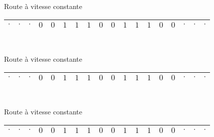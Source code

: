 \documentclass[12pt]{beamer}
\begin{document}
\begin{frame}{Route à vitesse constante}
\begin{center}
    \begin{tabular}{|c|c|c|c|c|c|c|c|c|c|c|c|c|c|c|c|c|c|}\hline
     $\cdot$ & $\cdot$ & $\cdot$ & $0$ & $0$ & $1$ & $1$ & $1$ & $0$ & $0$ & $1$ & $1$ & $1$ & $0$ & $0$ & $\cdot$ & $\cdot$ & $\cdot$ \\\hline
     
\end{tabular}\\
\end{center}
\end{frame}

\begin{frame}{Route à vitesse constante}
\begin{center}
    \begin{tabular}{|c|c|c|c|c|c|c|c|c|c|c|c|c|c|c|c|c|c|}\hline
     $\cdot$ & $\cdot$ & $\cdot$ & $0$ & $0$ & $1$ & $1$ & $1$ & $0$ & $0$ & $1$ & $1$ & $1$ & $0$ & $0$ & $\cdot$ & $\cdot$ & $\cdot$ \\\hline
     
\end{tabular}\\
\end{center}
\end{frame}

\begin{frame}{Route à vitesse constante}
\begin{center}
    \begin{tabular}{|c|c|c|c|c|c|c|c|c|c|c|c|c|c|c|c|c|c|}\hline
     $\cdot$ & $\cdot$ & $\cdot$ & $0$ & $0$ & $1$ & $1$ & $1$ & $0$ & $0$ & $1$ & $1$ & $1$ & $0$ & $0$ & $\cdot$ & $\cdot$ & $\cdot$ \\\hline
     
\end{tabular}\\
\end{center}
\end{frame}
\end{document}
